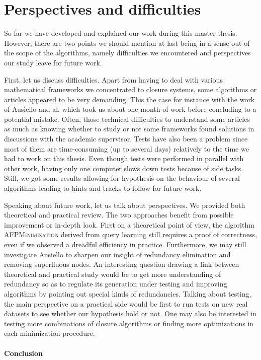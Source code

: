 \section{Perspectives and difficulties}

So far we have developed and explained our work during this master thesis. However, there are two points we should mention at last being in a sense out of 
the scope of the algorithms, namely difficulties we encountered and perspectives
our study leave for future work. 

\vspace{1.2em}

First, let us discuss difficulties. Apart from having to deal with various mathematical frameworks we concentrated to closure systems, some algorithms
or articles appeared to be very demanding. This the case for instance with the work of Ausiello and al. which took us about one month of work before concluding to a potential mistake. Often, those technical difficulties to understand some articles as much as knowing whether to study or not some frameworks found solutions in discussions with the academic supervisor. Tests have also been a problem since most of them are time-consuming (up to several days) relatively to the time we had to work on this thesis. Even though tests were performed in parallel with other work, having only one computer slows down tests because of side tasks. Still, we got some results allowing for hypothesis
on the behaviour of several algorithms leading to hints and tracks to follow for future work.

\vspace{1.2em}

Speaking about future work, let us talk about perspectives. We provided both theoretical and practical review. The two approaches benefit from possible improvement or in-depth look. First on a theoretical point of view, the algorithm \textsc{AFPMinimization} derived from query learning still requires
a proof of correctness, even if we observed a dreadful efficiency in practice. Furthermore, we may still investigate Ausiello to sharpen our insight of redundancy elimination and removing superfluous nodes. An interesting question
drawing a link between theoretical and practical study would be to get more
understanding of redundancy so as to regulate its generation under testing and
improving algorithms by pointing out special kinds of redundancies. Talking about testing, the main perspective on a practical side would be first to run tests on new real datasets to see whether our hypothesis hold or not. One may also be interested in testing more combinations of closure algorithms or finding
more optimizations in each minimization procedure.


\paragraph{Conclusion}

